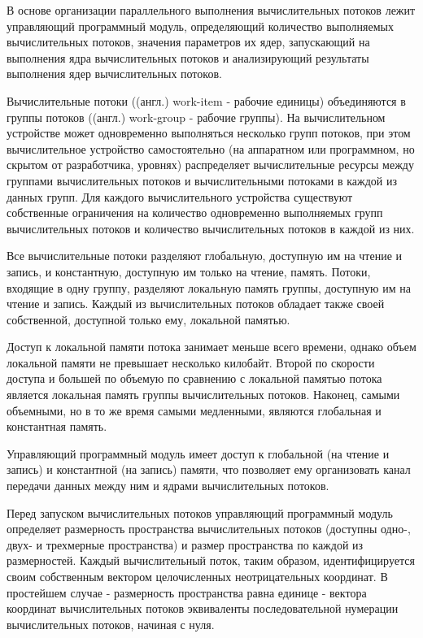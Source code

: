 В основе организации параллельного выполнения вычислительных потоков лежит управляющий программный модуль, определяющий количество выполняемых вычислительных потоков, значения параметров их ядер, запускающий на выполнения ядра вычислительных потоков и анализирующий результаты выполнения ядер вычислительных потоков.

Вычислительные потоки ((англ.) work-item - рабочие единицы) объединяются в группы потоков ((англ.) work-group - рабочие группы). На вычислительном устройстве может одновременно выполняться несколько групп потоков, при этом вычислительное устройство самостоятельно (на аппаратном или программном, но скрытом от разработчика, уровнях) распределяет вычислительные ресурсы между группами вычислительных потоков и вычислительными потоками в каждой из данных групп. Для каждого вычислительного устройства существуют собственные ограничения на количество одновременно выполняемых групп вычислительных потоков и количество вычислительных потоков в каждой из них.

Все вычислительные потоки разделяют глобальную, доступную им на чтение и запись, и константную, доступную им только на чтение, память. Потоки, входящие в одну группу, разделяют локальную память группы, доступную им на чтение и запись. Каждый из вычислительных потоков обладает также своей собственной, доступной только ему, локальной памятью.

Доступ к локальной памяти потока занимает меньше всего времени, однако объем локальной памяти не превышает несколько килобайт. Второй по скорости доступа и большей по объемую по сравнению с локальной памятью потока является локальная память группы вычислительных потоков. Наконец, самыми объемными, но в то же время самыми медленными, являются глобальная и константная память.

Управляющий программный модуль имеет доступ к глобальной (на чтение и запись) и константной (на запись) памяти, что позволяет ему организовать канал передачи данных между ним и ядрами вычислительных потоков.

Перед запуском вычислительных потоков управляющий программный модуль определяет размерность пространства вычислительных потоков (доступны одно-, двух- и трехмерные пространства) и размер пространства по каждой из размерностей. Каждый вычислительный поток, таким образом, идентифицируется своим собственным вектором целочисленных неотрицательных координат. В простейшем случае - размерность пространства равна единице - вектора координат вычислительных потоков эквиваленты последовательной нумерации вычислительных потоков, начиная с нуля.

